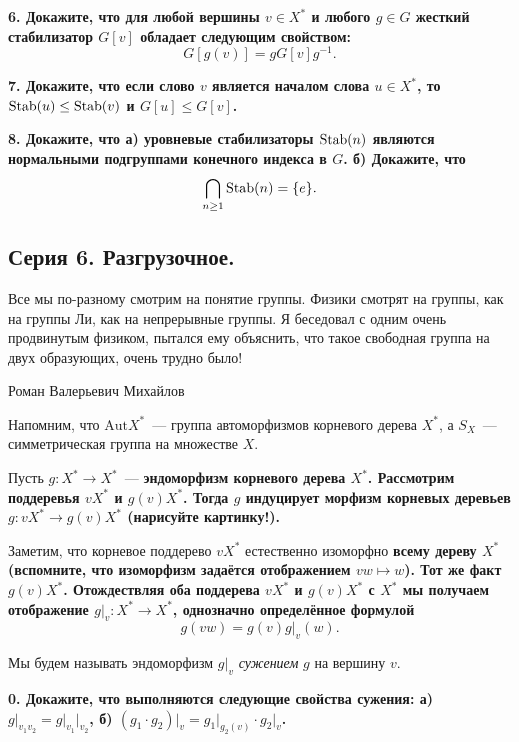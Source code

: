 \documentclass[12pt, oneside, dvipsnames]{extarticle}
\begin{document}
 	\bf{6.} Докажите, что для любой вершины $v \in X^*$ и любого $g \in G$ жесткий стабилизатор $G[v]$ обладает следующим свойством: 
 	\[
 		G[g(v)] = g G[v] g^{-1}.
 	\]

 	\bf{7.} Докажите, что если слово $v$ является началом слова $u \in X^*$, то $\operatorname{Stab}(u) \le \operatorname{Stab}(v)$ и $G[u] \le G[v]$.

 	\bf{8.} Докажите, что а) уровневые стабилизаторы $\operatorname{Stab}(n)$ являются нормальными подгруппами конечного индекса в $G$. б) Докажите, что  
 	\[
 		\bigcap_{n \ge 1} \operatorname{Stab}(n) = \{ e \}.
 	\]

 	\begin{center}
 		\subsection*{Серия 6. Разгрузочное. }
 	\end{center}


	\epigraph{Все мы по-разному смотрим на понятие группы. Физики смотрят на группы, как на группы Ли, как на непрерывные группы. Я беседовал с одним очень продвинутым физиком, пытался ему объяснить, что такое свободная группа на двух образующих, очень трудно было!}{Роман Валерьевич Михайлов}

	Напомним, что $\mathrm{Aut}{X^*}$~--- группа автоморфизмов корневого дерева $X^*$, а $S_{X}$~---  симметрическая группа на множестве $X$.

	Пусть $g\colon X^* \to X^*$~--- \bf{эндоморфизм} корневого дерева $X^*$. Рассмотрим поддеревья $v X^*$ и $g(v) X^*$. Тогда $g$ индуцирует морфизм корневых деревьев $g\colon v X^* \to g(v) X^*$ (\bf{нарисуйте картинку!}). 

	Заметим, что корневое поддерево $v X^*$ естественно изоморфно \bf{всему} дереву $X^*$ (вспомните, что изоморфизм задаётся отображением $vw \mapsto w$). Тот же факт $g(v)X^*$. Отождествляя оба поддерева $v X^*$ и $g(v) X^*$ с $X^*$ мы получаем отображение $g\vert_{v} \colon X^* \to X^*$, однозначно определённое формулой 
	\[
		g(vw) = g(v) g\vert_{v}(w).
	\]

	Мы будем называть эндоморфизм $g\vert_{v}$ \emph{сужением} $g$ на вершину $v$.

	\bf{0.} Докажите, что выполняются следующие свойства сужения: а) $g\vert_{v_1 v_2} = g\vert_{v_1}\vert_{v_2}$, б) $(g_1 \cdot g_2)\vert_{v} = g_1\vert_{g_2(v)} \cdot g_2\vert_{v}$. 
\end{document}
